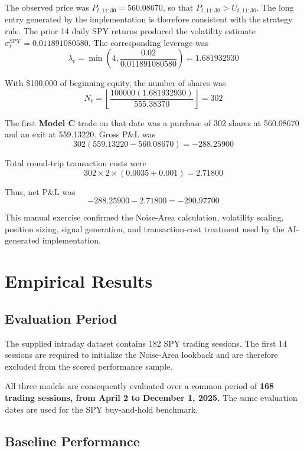 \documentclass{article}
\begin{document}
The observed price was \(P_{t,11:30}=560.08670\), so that \(P_{t,11:30} > U_{t,11:30}\). The long entry generated by the implementation is therefore consistent with the strategy rule. The prior 14 daily SPY returns produced the volatility estimate \(\sigma^{\text{SPY}}_t=0.011891080580\). The corresponding leverage was
\[
    \lambda_t
    =
    \min\left(
    4,
    \frac{0.02}{0.011891080580}
    \right)
    =
    1.681932930
\]

With \$100,000 of beginning equity, the number of shares was
\[
    N_t
    =
    \left\lfloor
    \frac{100000(1.681932930)}{555.38370}
    \right\rfloor
    =
    302
\]

The first\textbf{ Model C} trade on that date was a purchase of 302 shares at 560.08670 and an exit at 559.13220. Gross P\&L was
\[
    302(559.13220-560.08670)
    =
    -288.25900
\]

Total round-trip transaction costs were
\[
    302 \times 2 \times (0.0035+0.001)
    =
    2.71800
\]

Thus, net P\&L was
\[
    -288.25900 - 2.71800
    =
    -290.97700
\]

This manual exercise confirmed the Noise-Area calculation, volatility scaling, position sizing, signal generation, and transaction-cost treatment used by the AI-generated implementation.


\section{Empirical Results}
\label{sec:results}

\subsection{Evaluation Period}

The supplied intraday dataset contains 182 SPY trading sessions. The first 14 sessions are required to initialize the Noise-Area lookback and are therefore excluded from the scored performance sample.

All three models are consequently evaluated over a common period of \textbf{168 trading sessions, from April 2 to December 1, 2025.} The same evaluation dates are used for the SPY buy-and-hold benchmark.

\subsection{Baseline Performance}
\end{document}
